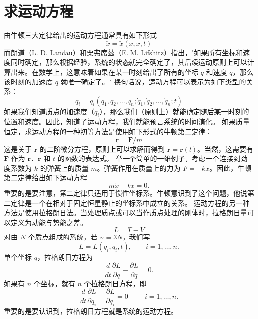 \section{求运动方程}
由牛顿三大定律给出的运动方程通常具有如下形式
\[
\ddot{x} = \ddot{x}(x, \dot{x}, t)
\]
而朗道（L. D. Landau）和栗弗席兹（E. M. Lifshitz）指出，"如果所有坐标和速度同时确定，那么根据经验，系统的状态就完全确定了，其后续运动原则上可以计算出来。在数学上，这意味着如果在某一时刻给出了所有的坐标 $q$ 和速度 $\dot{q}$，那么该时刻的加速度 $\ddot{q}$ 就唯一确定了。"
换句话说，运动方程可以表示为如下类型的关系：
\[
\ddot{q}_i = \ddot{q}_i(q_1, q_2, \ldots, q_n; \dot{q}_1, \dot{q}_2, \ldots, \dot{q}_n; t)
\]
如果我们知道质点的加速度（$\ddot{q}_i$），那么我们（原则上）就能确定随后某一时刻的位置和速度。因此，知道了运动方程，我们就能预言系统的时间演化。
如果质量恒定，求运动方程的一种初等方法是使用如下形式的牛顿第二定律：
\[
\ddot{\mathbf{r}} = \mathbf{F}/m
\]
这是关于 $\mathbf{r}$ 的二阶微分方程，原则上可以求解而得到 $\mathbf{r} = \mathbf{r}(t)$。当然，这需要有 $\mathbf{F}$ 作为 $\mathbf{r}$、$\dot{\mathbf{r}}$ 和 $t$ 的函数的表达式。
举一个简单的一维例子，考虑一个连接到劲度系数为 $k$ 的弹簧上的质量 $m$。弹簧作用在质量上的力为 $F = -kx$。因此，牛顿第二定律给出如下运动方程
\[
m\ddot{x} + kx = 0.
\]
重要的是要注意，第二定律只适用于惯性坐标系。牛顿意识到了这个问题，他说第二定律是一个在相对于固定恒星静止的坐标系中成立的关系。
运动方程的另一种方法是使用拉格朗日法。当处理质点或可以当作质点处理的刚体时，拉格朗日量可以定义为动能与势能之差。
\[
L = T - V
\]
对由 $N$ 个质点组成的系统，若 $n = 3N$，我们写
\[
L = L(q_i, \dot{q}_i, t), \qquad i = 1, \ldots, n.
\]
单个坐标 $q$，拉格朗日方程为
\[
\frac{d}{dt}\frac{\partial L}{\partial \dot{q}} - \frac{\partial L}{\partial q} = 0.
\]
如果有 $n$ 个坐标，就有 $n$ 个拉格朗日方程，即
\[
\frac{d}{dt}\frac{\partial L}{\partial \dot{q}_i} - \frac{\partial L}{\partial q_i} = 0, \qquad i = 1, \ldots, n.
\]
重要的是要认识到，拉格朗日方程就是系统的运动方程。

